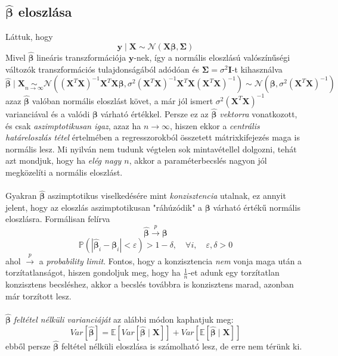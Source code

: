 \documentclass[14p]{report}
\def\pmb{\boldsymbol}
\def\ebeta{\hat{\pmb{\beta}}}
\newcounter{x}
\newcounter{y}
\newcounter{z}
\begin{document}
	\subsection{$\ebeta$ eloszlása}
	Láttuk, hogy
	\[
		\pmb{y} \mid \pmb{X} \sim \mathcal{N}(\pmb{X}\pmb{\beta}, \pmb{\Sigma})
	\]
	Mivel $\ebeta$ lineáris transzformációja $\pmb{y}$-nek, így a normális eloszlású valószínűségi változók transzformációs tulajdonságából adódóan és $\pmb{\Sigma} = \sigma^2\pmb{I}$-t kihasználva
	\[
		\ebeta \mid \pmb{X} \underset{n \rightarrow \infty}{\sim} \mathcal{N}((\pmb{X}^T\pmb{X})^{-1}\pmb{X}^T\pmb{X}\pmb{\beta}, \sigma^2(\pmb{X}^T\pmb{X})^{-1}\pmb{X}^T\pmb{X}(\pmb{X}^T\pmb{X})^{-1}) \sim \mathcal{N}(\pmb{\beta}, \sigma^2(\pmb{X}^T\pmb{X})^{-1})
	\] 
	azaz $\ebeta$ valóban normális eloszlást követ, a már jól ismert $\sigma^2(\pmb{X}^T\pmb{X})^{-1}$ varianciával és a valódi $\pmb{\beta}$ várható értékkel. Persze ez az $\ebeta$ \emph{vektorra} vonatkozott, és csak \emph{aszimptotikusan igaz}, azaz ha $n \rightarrow \infty$, hiszen ekkor a \emph{centrális határeloszlás tétel} értelmében a regresszorokból összetett mátrixkifejezés maga is normális lesz. Mi nyilván nem tudunk végtelen sok mintavétellel dolgozni, tehát azt mondjuk, hogy ha \emph{elég nagy $n$}, akkor a paraméterbecslés nagyon jól megközelíti a normális eloszlást.
	\\
	\\
	Gyakran $\ebeta$ aszimptotikus viselkedésére mint \emph{konzisztencia} utalnak, ez annyit jelent, hogy az eloszlás aszimptotikusan "ráhúzódik" a $\pmb{\beta}$ várható értékű normális eloszlásra. Formálisan felírva
	\[
		\ebeta \overset{p}{\rightarrow} \pmb{\beta} 
	\]
	\[
		\mathbb{P}(|\ebeta_i - \pmb{\beta}_i| < \varepsilon) > 1 - \delta, \quad \forall i, \quad \varepsilon, \delta > 0
	\]
	ahol $\overset{p}{\rightarrow}$ a \emph{probability limit}.
	Fontos, hogy a konzisztencia \emph{nem} vonja maga után a torzítatlanságot, hiszen gondoljuk meg, hogy ha $\frac{1}{n}$-et adunk egy torzítatlan konzisztens becsléshez, akkor a becslés továbbra is konzisztens marad, azonban már torzított lesz.
	\\
	\\
	$\ebeta$ \emph{feltétel nélküli varianciáját} az alábbi módon kaphatjuk meg:
	\[
		Var[\ebeta] = \mathbb{E}[Var[\ebeta \mid \pmb{X}]] + Var[\mathbb{E}[\ebeta \mid \pmb{X}]]
	\]
	ebből persze $\ebeta$ feltétel nélküli eloszlása is számolható lesz, de erre nem térünk ki.
	
\end{document}

